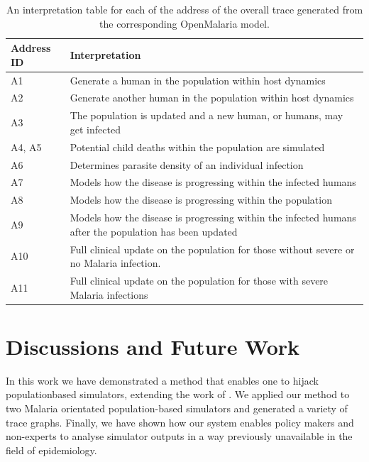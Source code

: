 \documentclass{article}
\begin{document}
\begin{table}[h!]
  \footnotesize
  \setlength{\tabcolsep}{1mm}
  \caption{An interpretation table for each of the address of the 
  overall trace generated from the corresponding OpenMalaria model.}
  \label{table:addresses}
  \begin{tabularx}{\textwidth}{@{}lX@{}} 
    \toprule
    Address ID & Interpretation \\
    \midrule
  A1 & Generate a human in the population within host dynamics\\

  
  A2 & Generate another human in the population within host dynamics\\

  A3 & The population is updated and a new human, or humans, may get infected \\

  A4, A5 & Potential child deaths within the population are simulated \\

  A6 & Determines parasite density of an individual infection \\

  A7 & Models how the disease is progressing within the infected humans \\

  A8 & Models how the disease is progressing within the population \\
  
  A9 & Models how the disease is progressing within the infected humans after the population has been updated\\

  A10 & Full clinical update on the population for those without severe or no Malaria infection. \\

  A11 & Full clinical update on the population for those with severe Malaria infections \\
\bottomrule
  \end{tabularx}
  \end{table}


\section{Discussions and Future Work}

In this work we have demonstrated a method 
that enables one to hijack populationbased simulators, extending 
the work of \citep{baydin2018efficient}. 
We applied our method to two Malaria orientated population-based simulators and 
generated a variety of trace graphs.
Finally, we have shown how our system
enables policy makers and non-experts to analyse simulator outputs in a 
way previously unavailable in the field of epidemiology. 
\end{document}
